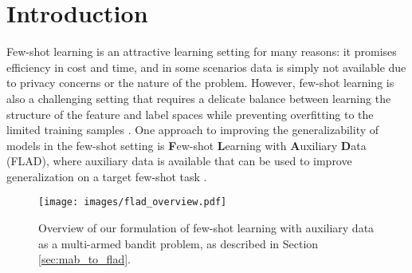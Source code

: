 \section{Introduction}

Few-shot learning is an attractive learning setting for many reasons: it promises efficiency in cost and time, and in some scenarios data is simply not available due to privacy concerns or the nature of the problem. However, few-shot learning is also a challenging setting that requires a delicate balance between learning the structure of the feature and label spaces while preventing overfitting to the limited training samples \citep{ravi2017optimization, 10.1145/3386252, https://doi.org/10.48550/arxiv.2203.04291}. One approach to improving the generalizability of models in the few-shot setting is \textbf{F}ew-shot \textbf{L}earning with \textbf{A}uxiliary \textbf{D}ata (FLAD), where auxiliary data is available that can be used to improve generalization on a target few-shot task \citep{10.1145/1015330.1015436, https://doi.org/10.48550/arxiv.1812.02224, esfandiarpoor2021, Verboven2022}.

 \begin{figure*}
     \centering
     \texttt{[image: images/flad\_overview.pdf]}
     \vspace{-5mm}
     \caption{Overview of our formulation of few-shot learning with auxiliary data as a multi-armed bandit problem, as described in Section \ref{sec:mab_to_flad}.}
     \label{fig:flad_overview}
 \end{figure*}

